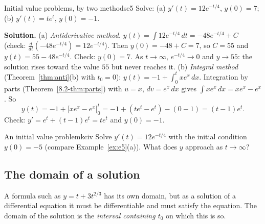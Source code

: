 \documentclass[11pt]{article}
\begin{document}
\begin{exmp}{Initial value problems, by two methods}{e5}
Solve: (a) $y'(t)=12e^{-t/4}$, $y(0)=7$; (b) $y'(t)=te^{t}$, $y(0)=-1$.

\textbf{Solution.} (a) \emph{Antiderivative method.} $y(t)=\int12e^{-t/4}\,dt=-48e^{-t/4}+C$ (check: $\frac{d}{dt}(-48e^{-t/4})=12e^{-t/4}$). Then $y(0)=-48+C=7$, so $C=55$ and $y(t)=55-48e^{-t/4}$. Check: $y(0)=7$. As $t\to\infty$, $e^{-t/4}\to0$ and $y\to55$: the solution rises toward the value $55$ but never reaches it.
(b) \emph{Integral method} (Theorem~\ref{thm:anti}(b) with $t_0=0$): $y(t)=-1+\int_0^txe^x\,dx$. Integration by parts (Theorem~\ref{8.2-thm:parts}) with $u=x$, $dv=e^x\,dx$ gives $\int xe^x\,dx=xe^x-e^x$. So
\[
y(t)=-1+\Big[xe^x-e^x\Big]_0^t=-1+(te^t-e^t)-(0-1)=(t-1)e^t .
\]
Check: $y'=e^t+(t-1)e^t=te^t$ and $y(0)=-1$.
\end{exmp}

\begin{kc}{An initial value problem}{kciv}
Solve $y'(t)=12e^{-t/4}$ with the initial condition $y(0)=-5$ (compare Example~\ref{ex:e5}(a)). What does $y$ approach as $t\to\infty$?
\end{kc}

\subsection*{The domain of a solution}

A formula such as $y=t+3t^{2/3}$ has its own domain, but as a solution of a differential equation it must be differentiable and must satisfy the equation. The domain of the solution is the \emph{interval containing $t_0$} on which this is so.
\end{document}
